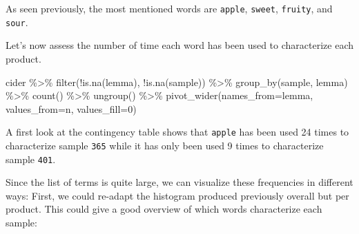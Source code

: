 \documentclass[
]{book}
\newenvironment{Shaded}{\begin{snugshade}}{\end{snugshade}}
\newcommand{\AttributeTok}[1]{\textcolor[rgb]{0.77,0.63,0.00}{#1}}
\newcommand{\DecValTok}[1]{\textcolor[rgb]{0.00,0.00,0.81}{#1}}
\newcommand{\FunctionTok}[1]{\textcolor[rgb]{0.00,0.00,0.00}{#1}}
\newcommand{\NormalTok}[1]{#1}
\newcommand{\SpecialCharTok}[1]{\textcolor[rgb]{0.00,0.00,0.00}{#1}}
\begin{document}
As seen previously, the most mentioned words are \texttt{apple}, \texttt{sweet}, \texttt{fruity}, and \texttt{sour}.

Let's now assess the number of time each word has been used to characterize each product.

\begin{Shaded}
\begin{Highlighting}[]
\NormalTok{cider }\SpecialCharTok{\%\textgreater{}\%} 
  \FunctionTok{filter}\NormalTok{(}\SpecialCharTok{!}\FunctionTok{is.na}\NormalTok{(lemma), }\SpecialCharTok{!}\FunctionTok{is.na}\NormalTok{(sample)) }\SpecialCharTok{\%\textgreater{}\%} 
  \FunctionTok{group\_by}\NormalTok{(sample, lemma) }\SpecialCharTok{\%\textgreater{}\%} 
  \FunctionTok{count}\NormalTok{() }\SpecialCharTok{\%\textgreater{}\%} 
  \FunctionTok{ungroup}\NormalTok{() }\SpecialCharTok{\%\textgreater{}\%} 
  \FunctionTok{pivot\_wider}\NormalTok{(}\AttributeTok{names\_from=}\NormalTok{lemma, }\AttributeTok{values\_from=}\NormalTok{n, }\AttributeTok{values\_fill=}\DecValTok{0}\NormalTok{)}
\end{Highlighting}
\end{Shaded}

A first look at the contingency table shows that \texttt{apple} has been used 24 times to characterize sample \texttt{365} while it has only been used 9 times to characterize sample \texttt{401}.

Since the list of terms is quite large, we can visualize these frequencies in different ways: First, we could re-adapt the histogram produced previously overall but per product. This could give a good overview of which words characterize each sample:
\end{document}
